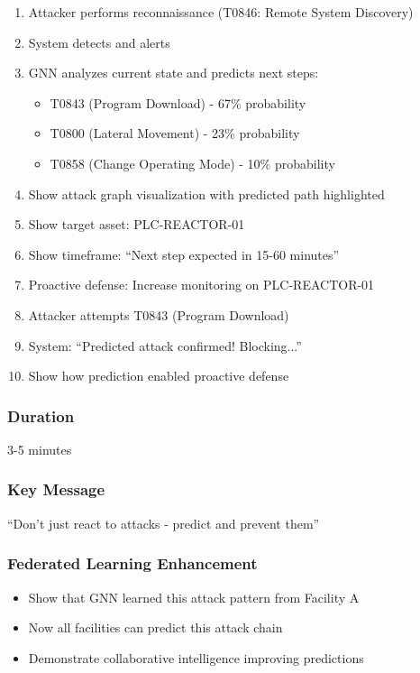 \documentclass[11pt,a4paper]{article}
\begin{document}
\begin{enumerate}[leftmargin=*]
    \item Attacker performs reconnaissance (T0846: Remote System Discovery)
    \item System detects and alerts
    \item GNN analyzes current state and predicts next steps:
    \begin{itemize}
        \item T0843 (Program Download) - 67\% probability
        \item T0800 (Lateral Movement) - 23\% probability
        \item T0858 (Change Operating Mode) - 10\% probability
    \end{itemize}
    \item Show attack graph visualization with predicted path highlighted
    \item Show target asset: PLC-REACTOR-01
    \item Show timeframe: ``Next step expected in 15-60 minutes''
    \item Proactive defense: Increase monitoring on PLC-REACTOR-01
    \item Attacker attempts T0843 (Program Download)
    \item System: ``Predicted attack confirmed! Blocking...''
    \item Show how prediction enabled proactive defense
\end{enumerate}

\subsubsection{Duration}
3-5 minutes

\subsubsection{Key Message}
``Don't just react to attacks - predict and prevent them''

\subsubsection{Federated Learning Enhancement}
\begin{itemize}[leftmargin=*]
    \item Show that GNN learned this attack pattern from Facility A
    \item Now all facilities can predict this attack chain
    \item Demonstrate collaborative intelligence improving predictions
\end{itemize}
\end{document}
